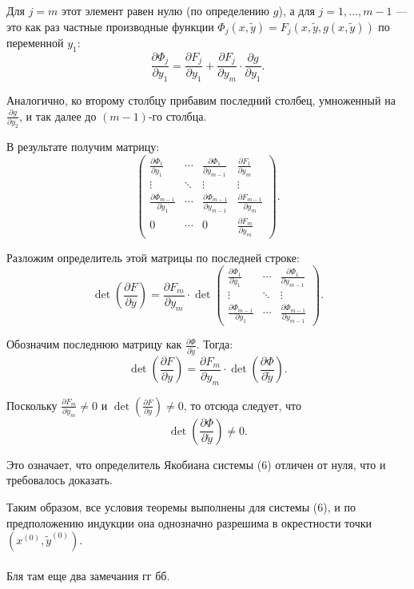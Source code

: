 \documentclass{article}
\begin{document}
Для $j = m$ этот элемент равен нулю (по определению $g$), а для $j = 1, \dots, m-1$ — это как раз частные производные функции $\Phi_j(x, \widetilde{y}) = F_j(x, \widetilde{y}, g(x, \widetilde{y}))$ по переменной $y_1$:
\[
\frac{\partial \Phi_j}{\partial y_1} = \frac{\partial F_j}{\partial y_1} + \frac{\partial F_j}{\partial y_m} \cdot \frac{\partial g}{\partial y_1}.
\]

Аналогично, ко второму столбцу прибавим последний столбец, умноженный на $\frac{\partial g}{\partial y_2}$, и так далее до $(m-1)$-го столбца.

В результате получим матрицу:
\[
\begin{pmatrix}
\frac{\partial \Phi_1}{\partial y_1} & \cdots & \frac{\partial \Phi_1}{\partial y_{m-1}} & \frac{\partial F_1}{\partial y_m} \\
\vdots & \ddots & \vdots & \vdots \\
\frac{\partial \Phi_{m-1}}{\partial y_1} & \cdots & \frac{\partial \Phi_{m-1}}{\partial y_{m-1}} & \frac{\partial F_{m-1}}{\partial y_m} \\
0 & \cdots & 0 & \frac{\partial F_m}{\partial y_m}
\end{pmatrix}.
\]

Разложим определитель этой матрицы по последней строке:
\[
\det \left( \frac{\partial F}{\partial y} \right) = \frac{\partial F_m}{\partial y_m} \cdot \det \left(
\begin{array}{ccc}
\frac{\partial \Phi_1}{\partial y_1} & \cdots & \frac{\partial \Phi_1}{\partial y_{m-1}} \\
\vdots & \ddots & \vdots \\
\frac{\partial \Phi_{m-1}}{\partial y_1} & \cdots & \frac{\partial \Phi_{m-1}}{\partial y_{m-1}}
\end{array}
\right).
\]

Обозначим последнюю матрицу как $\frac{\partial \Phi}{\partial \widetilde{y}}$. Тогда:
\[
\det \left( \frac{\partial F}{\partial y} \right) = \frac{\partial F_m}{\partial y_m} \cdot \det \left( \frac{\partial \Phi}{\partial \widetilde{y}} \right).
\]

Поскольку $\frac{\partial F_m}{\partial y_m} \neq 0$ и $\det \left( \frac{\partial F}{\partial y} \right) \neq 0$, то отсюда следует, что
\[
\det \left( \frac{\partial \Phi}{\partial \widetilde{y}} \right) \neq 0.
\]

Это означает, что определитель Якобиана системы (6) отличен от нуля, что и требовалось доказать.

Таким образом, все условия теоремы выполнены для системы (6), и по предположению индукции она однозначно разрешима в окрестности точки $(x^{(0)}, \widetilde{y}^{(0)})$.
\\\\
Бля там еще два замечания гг бб.
\end{document}
